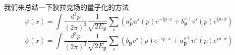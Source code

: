 
我们来总结一下狄拉克场的量子化的方法
\begin{equation}
\psi(x) = \int \frac{d^3 p}{(2\pi)^3} \frac{1}{\sqrt{2 E_{\mathbf p}}} \sum_s (a_{\mathbf p}^s u^s (p) e^{-ip\cdot x} + b_{\mathbf p}^{s\dagger} v^s(p) e^{ip\cdot x})
\end{equation}
\begin{equation}
\bar \psi (x) = \int \frac{d^3 p}{(2\pi)^3} \frac{1}{\sqrt{2 E_{\mathbf p}}} \sum_s (b_{\mathbf p}\bar v ^s(p) e^{- i p\cdot x}+ a_{\mathbf p}^{s\dagger} \bar u^s(p)e^{i p \cdot x})
\end{equation}


